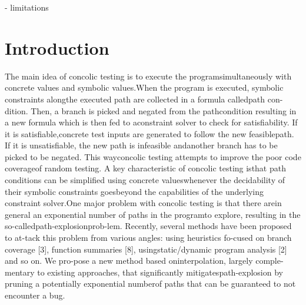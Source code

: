 \documentclass[	runningheads,
				a4paper]{llncs}
\begin{document}
- limitations 


\section{Introduction}
The main idea of concolic testing is to execute the programsimultaneously  with  concrete  values  and  symbolic  values.When the program is executed, symbolic constraints alongthe executed path are collected in a formula calledpath con-dition.  Then, a branch is picked and negated from the pathcondition resulting in a new formula which is then fed to aconstraint solver to check for satisfiability.  If it is satisfiable,concrete test inputs are generated to follow the new feasiblepath.   If  it  is  unsatisfiable,  the  new  path  is  infeasible  andanother branch has to be picked to be negated.  This wayconcolic testing attempts to improve the poor code coverageof random testing.  A key characteristic of concolic testing isthat path conditions can be simplified using concrete valueswhenever the decidability of their symbolic constraints goesbeyond the capabilities of the underlying constraint solver.One major problem with concolic testing is that there arein general an exponential number of paths in the programto  explore,  resulting  in  the  so-calledpath-explosionprob-lem.  Recently, several methods have been proposed to at-tack this problem from various angles:  using heuristics fo-cused on branch coverage [3], function summaries [8], usingstatic/dynamic  program  analysis  [2]  and  so  on.   We  pro-pose a new method based oninterpolation, largely comple-mentary to existing approaches, that significantly mitigatespath-explosion by pruning a potentially exponential numberof paths that can be guaranteed to not encounter a bug.
\end{document}

